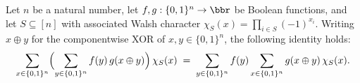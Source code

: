 \begin{lemma}
\label{BoolFourier.fourier_coeff_convolution_aux_h_fubini}
\leanok
{}
Let $n$ be a natural number, let $f, g : \{0,1\}^n \to \bbr$ be Boolean functions, and
let $S \subseteq [n]$ with associated Walsh character $\chi_S(x) = \prod_{i \in
S}(-1)^{x_i}$. Writing $x \oplus y$ for the componentwise XOR of $x, y \in \{0,1\}^n$,
the following identity holds:
\[
\sum_{x \in \{0,1\}^n} \Bigl(\sum_{y \in \{0,1\}^n} f(y)\,g(x \oplus y)\Bigr)\,\chi_S(x)
  \;=\;
  \sum_{y \in \{0,1\}^n} f(y) \sum_{x \in \{0,1\}^n} g(x \oplus y)\,\chi_S(x).
\]
\end{lemma}

